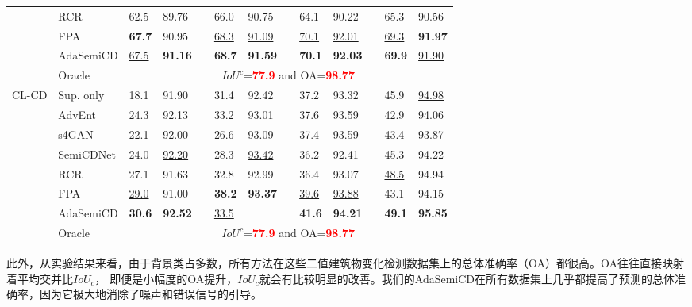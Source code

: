 \documentclass[lang=chs, degree=master, blindreview=false, adobe=false]{yanputhesis}
\begin{document}
\begin{table}[!htbp]
{\begin{tabular}{p{20mm}p{20mm}p{8mm}p{8mm}cp{8mm}p{8mm}cp{8mm}p{8mm}cp{8mm}p{8mm}}
      & RCR\cite{bandara2022RCR}& 62.5 & 89.76 && 66.0 & 90.75 && 64.1 & 90.22 && 65.3 & 90.56 \\
      & FPA\cite{Zhang2023FPA}& \cellcolor{mycyan}\textbf{67.7} & 90.95 && \underline{68.3} & \underline{91.09} && \underline{70.1} & \underline{92.01} && \underline{69.3} & \cellcolor{mycyan}\textbf{91.97} \\
      \rowcolor{mycyan}
      \multirow{-8}{*}{\cellcolor{white}}& \cellcolor{white}AdaSemiCD   &   \cellcolor{white}\underline{67.5} & \textbf{91.16} && \textbf{68.7} & \textbf{91.59} && \textbf{70.1} & \textbf{92.03} && \textbf{69.9} & \cellcolor{white}\underline{91.90} \\%
      \cline{2-13}
      & Oracle & \multicolumn{11}{c}{$ IoU^c$=\textcolor{red}{\bf 77.9} and OA=\textcolor{red}{\bf 98.77}} \\
      \bottomrule
      \multirow{8}{*}{CL-CD}
      & Sup. only   &   18.1 & 91.90 && 31.4 & 92.42 && 37.2 & 93.32 && 45.9 & \underline{94.98} \\ %
      & AdvEnt\cite{vu2019advent}& 24.3 & 92.13 && 33.2 & 93.01 && 37.6 & 93.59 && 42.9 & 94.06 \\ %
      & s4GAN\cite{mittal2019semi}& 22.1 & 92.00 && 26.6 & 93.09 && 37.4 & 93.59 && 43.4 & 93.87 \\
      & SemiCDNet\cite{peng2021SemiCDNet} & 24.0 & \underline{92.20} && 28.3 & \underline{93.42} && 36.2 & 92.41 && 45.3 & 94.22 \\ %
      & RCR\cite{bandara2022RCR}& 27.1 & 91.63 && 32.8 & 92.99 && 36.4 & 93.07 && \underline{48.5} & 94.94 \\
      & FPA\cite{Zhang2023FPA}& \underline{29.0} & 91.00 && \cellcolor{mycyan}\textbf{38.2} & \cellcolor{mycyan}\textbf{93.37} && \underline{39.6} & \underline{93.88} && 43.1 & 94.15 \\
      \rowcolor{mycyan}
      \multirow{-8}{*}{\cellcolor{white}}& \cellcolor{white}AdaSemiCD   &   \textbf{30.6} & \textbf{92.52} && \cellcolor{white}\underline{33.5} & \cellcolor{white}{92.40} && \textbf{41.6} & \textbf{94.21} && \textbf{49.1} & \textbf{95.85} \\%
      \cline{2-13}
      & Oracle & \multicolumn{11}{c}{$ IoU^c$=\textcolor{red}{\bf 77.9} and OA=\textcolor{red}{\bf 98.77}} \\
      \bottomrule
  \end{tabular}
  }
  \label{tab:Ada-mutil}
\end{table}

此外，从实验结果来看，由于背景类占多数，所有方法在这些二值建筑物变化检测数据集上的总体准确率（OA）都很高。OA往往直接映射着平均交并比$IoU_c$， 即便是小幅度的OA提升，$IoU_c$就会有比较明显的改善。我们的AdaSemiCD在所有数据集上几乎都提高了预测的总体准确率，因为它极大地消除了噪声和错误信号的引导。
\end{document}
